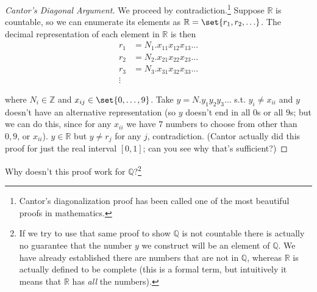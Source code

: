 \documentclass{article}
\begin{document}
\begin{proof}[Cantor's Diagonal Argument]
  We proceed by contradiction.\footnote{Cantor's diagonalization proof has been called one of the most beautiful proofs in mathematics.} Suppose $\mathbb{R}$ is countable, so we can enumerate its elements as $\mathbb{R} = \set{r_1, r_2, \ldots}$. The decimal representation of each element in $\mathbb{R}$ is then
  \begin{align*}
    r_1 & = N_1.x_{11}x_{12}x_{13}\ldots \\
    r_2 & = N_2.x_{21}x_{22}x_{23}\ldots \\
    r_3 & = N_3.x_{31}x_{32}x_{33}\ldots \\
    \vdots
  \end{align*}

  where $N_i \in \mathbb{Z}$ and $x_{ij} \in \set{0, \ldots, 9}$. Take $y = N.y_1y_2y_3\ldots$ s.t. $y_i \ne x_{ii}$ and $y$ doesn't have an alternative representation (so $y$ doesn't end in all $0$s or all $9$s; but we can do this, since for any $x_{ii}$ we have $7$ numbers to choose from other than $0, 9$, or $x_{ii}$). $y \in \mathbb{R}$ but $y \ne r_j$ for any $j$, contradiction. (Cantor actually did this proof for just the real interval $[0, 1]$; can you see why that's sufficient?)
\end{proof}

Why doesn't this proof work for $\mathbb{Q}$?\footnote{If we try to use that same proof to show $\mathbb{Q}$ is not countable there is actually no guarantee that the number $y$ we construct will be an element of $\mathbb{Q}$. We have already established there are numbers that are not in $\mathbb{Q}$, whereas $\mathbb{R}$ is actually defined to be complete (this is a formal term, but intuitively it means that $\mathbb{R}$ has \textit{all} the numbers).}
\end{document}

